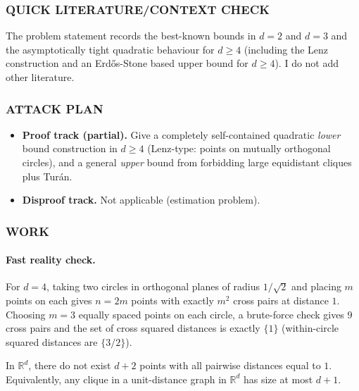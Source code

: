 \subsubsection*{QUICK LITERATURE/CONTEXT CHECK}
The problem statement records the best-known bounds in \(d=2\) and \(d=3\) and the asymptotically tight quadratic behaviour for \(d\ge 4\) (including the Lenz construction and an Erd\H{o}s-Stone based upper bound for \(d\ge 4\)). I do not add other literature.

\subsubsection*{ATTACK PLAN}
\begin{itemize}
\item \textbf{Proof track (partial).} Give a completely self-contained quadratic \emph{lower} bound construction in \(d\ge 4\) (Lenz-type: points on mutually orthogonal circles), and a general \emph{upper} bound from forbidding large equidistant cliques plus Tur\'an.
\item \textbf{Disproof track.} Not applicable (estimation problem).
\end{itemize}

\subsubsection*{WORK}

\paragraph{Fast reality check.} For \(d=4\), taking two circles in orthogonal planes of radius \(1/\sqrt2\) and placing \(m\) points on each gives \(n=2m\) points with exactly \(m^2\) cross pairs at distance \(1\). Choosing \(m=3\) equally spaced points on each circle, a brute-force check gives \(9\) cross pairs and the set of cross squared distances is exactly \(\{1\}\) (within-circle squared distances are \(\{3/2\}\)).

\begin{lemma}
In \(\mathbb{R}^d\), there do not exist \(d+2\) points with all pairwise distances equal to \(1\). Equivalently, any clique in a unit-distance graph in \(\mathbb{R}^d\) has size at most \(d+1\).
\end{lemma}

